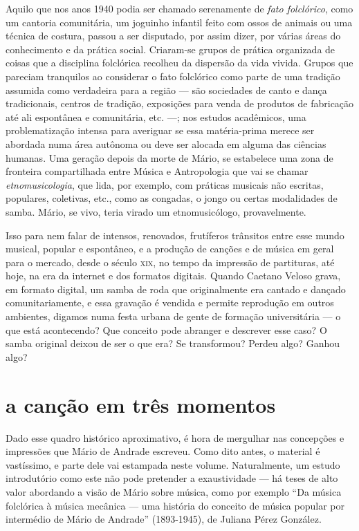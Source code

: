 Aquilo que nos anos 1940 podia ser chamado serenamente de \textit{fato
folclórico}, como um cantoria comunitária, um joguinho infantil feito
com ossos de animais ou uma técnica de costura, passou a ser disputado,
por assim dizer, por várias áreas do conhecimento e da prática social.
Criaram-se grupos de prática organizada de coisas que a disciplina
folclórica recolheu da dispersão da vida vivida. Grupos que pareciam
tranquilos ao considerar o fato folclórico como parte de uma tradição
assumida como verdadeira para a região --- são sociedades de canto e
dança tradicionais, centros de tradição, exposições para venda de
produtos de fabricação até ali espontânea e comunitária, etc. ---; nos
estudos acadêmicos, uma problematização intensa para averiguar se essa
matéria-prima merece ser abordada numa área autônoma ou deve ser alocada
em alguma das ciências humanas. Uma geração depois da morte de Mário, se
estabelece uma zona de fronteira compartilhada entre Música e
Antropologia que vai se chamar \textit{etnomusicologia}, que lida, por
exemplo, com práticas musicais não escritas, populares, coletivas, etc.,
como as congadas, o jongo ou certas modalidades de samba. Mário, se
vivo, teria virado um etnomusicólogo, provavelmente.

Isso para nem falar de intensos, renovados, frutíferos trânsitos entre
esse mundo musical, popular e espontâneo, e a produção de canções e de
música em geral para o mercado, desde o século \textsc{xix}, no tempo da impressão
de partituras, até hoje, na era da internet e dos formatos digitais.
Quando Caetano Veloso grava, em formato digital, um samba de roda que
originalmente era cantado e dançado comunitariamente, e essa gravação é
vendida e permite reprodução em outros ambientes, digamos numa festa
urbana de gente de formação universitária --- o que está acontecendo? Que
conceito pode abranger e descrever esse caso? O samba original deixou de
ser o que era? Se transformou? Perdeu algo? Ganhou algo?

\section{a canção em três momentos}

Dado esse quadro histórico aproximativo, é hora de mergulhar nas
concepções e impressões que Mário de Andrade escreveu. Como dito antes,
o material é vastíssimo, e parte dele vai estampada neste volume.
Naturalmente, um estudo introdutório como este não pode pretender a
exaustividade --- há teses de alto valor abordando a visão de Mário sobre
música, como por exemplo ``Da música folclórica à música mecânica ---
uma história do conceito de música popular por intermédio de Mário de
Andrade'' (1893-1945), de Juliana Pérez González.%

